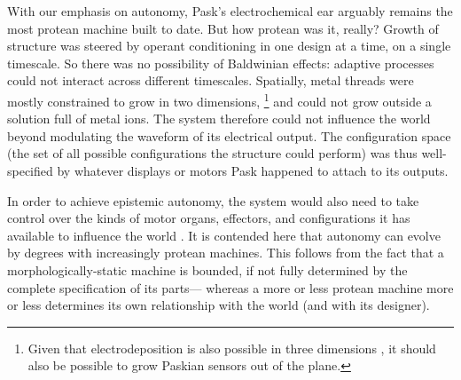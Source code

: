 With our emphasis on autonomy,
Pask's electrochemical ear 
arguably remains the most protean machine built to date.
But how protean was it, really?
Growth of structure was steered by operant conditioning in one design at a time, on a single timescale.
So there was no possibility of Baldwinian effects: adaptive processes could not interact across different timescales.
Spatially,
metal threads were mostly constrained to grow 
in two dimensions,%
\footnote{%
Given that electrodeposition is also possible in three dimensions \cite{madden1995fabrication}, it should also be possible to grow Paskian sensors out of the plane.
}
and could not grow outside a solution full of metal ions.
The system therefore could not influence the world beyond modulating the waveform of its electrical output.
The 
configuration space
(the set of all possible 
configurations
the structure could perform)
was thus well-specified by whatever displays or motors Pask happened to attach to its outputs.


In order to achieve epistemic autonomy,
the system would also need to take control over the kinds 
of 
motor organs,
effectors, and
configurations
it has available to influence the world \cite{cariani1993evolve}.
It is contended here that autonomy can evolve by degrees with increasingly protean machines.
This follows from the fact that a morphologically-static machine is bounded, if not fully determined by the complete specification of its parts---%
whereas a more or less protean machine more or less determines its own relationship with the world (and with its designer).


